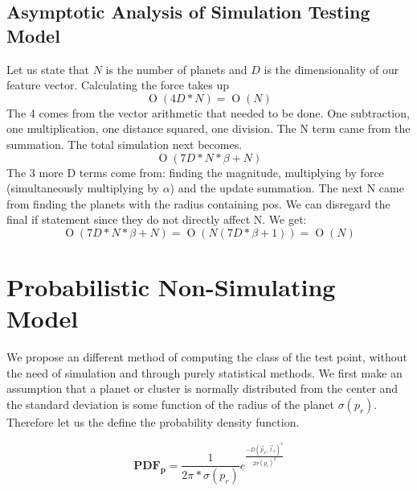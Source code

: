 \documentclass[journal]{IEEEtran}
\newcommand{\BigO}[1]{\ensuremath{\operatorname{O}\left(#1\right)}}
\begin{document}
\subsection{Asymptotic Analysis of Simulation Testing Model}
Let us state that $N$ is the number of planets and $D$ is the dimensionality of our feature vector. Calculating the force takes up 
\begin{equation}
\BigO{4D*N} = \BigO{N} 
\end{equation}
The 4 comes from the vector arithmetic that needed to be done. One subtraction, one multiplication, one distance squared, one division. The N term came from the summation. The total simulation next becomes.
\begin{equation}
\BigO{7D*N *\beta + N} 
\end{equation}
The 3 more D terms come from: finding the magnitude, multiplying by force (simultaneously multiplying by $\alpha$) and the update summation. The next N came from finding the planets with the radius containing pos. We can disregard the final if statement since they do not directly affect N. We get:
\begin{equation}
\BigO{7D*N *\beta + N} = \BigO{N(7D*\beta+1) }=\BigO{N}  
\end{equation} 

\section{Probabilistic Non-Simulating Model}
We propose an different method of computing the class of the test point, without the need of simulation and through purely statistical methods. We first make an assumption that a planet or cluster is normally distributed from the center and the standard deviation is some function of the radius of the planet $\sigma(p_r)$. Therefore let us the define the probability density function.

\begin{equation}
\mathbf{PDF_p} = \frac{1}{2\pi*\sigma(p_r)} e ^ \frac{-D(\overrightarrow{p}_x,\overrightarrow{l}_x)^2}{2\sigma(p_r)^2}
\end{equation}
\end{document}
